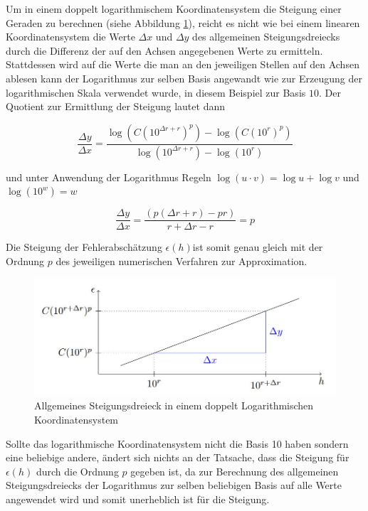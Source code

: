 Um in einem doppelt logarithmischem Koordinatensystem die Steigung einer Geraden zu berechnen (siehe Abbildung \ref{steigung}), reicht es nicht wie bei einem linearen Koordinatensystem die Werte $\Delta x$ und $\Delta y$ des allgemeinen Steigungsdreiecks durch die Differenz der auf den Achsen angegebenen Werte zu ermitteln.\\
Stattdessen wird auf die Werte die man an den jeweiligen Stellen auf den Achsen ablesen kann der Logarithmus zur selben Basis angewandt wie zur Erzeugung der logarithmischen Skala verwendet wurde, in diesem Beispiel zur Basis $10$. Der Quotient zur Ermittlung der Steigung lautet dann 

\begin{equation*}
	\frac{\Delta y}{\Delta x} = \frac{\log(C (10^{\Delta r +r})^p)-\log(C (10^r)^p)}{\log(10^{\Delta r +r}) - \log(10^r)}
\end{equation*} 

und unter Anwendung der Logarithmus Regeln $\log(u\cdot v) = \log u + \log v$ und $\log (10^w) = w$ 

\begin{equation*}
	\frac{\Delta y}{\Delta x} = \frac{(p(\Delta r +r)-pr)}{r+\Delta r -r}
	=p
\end{equation*}

Die Steigung der Fehlerabschätzung $\epsilon (h)$ist somit genau gleich mit der Ordnung $p$ des jeweiligen numerischen Verfahren zur Approximation.

\begin{figure}[htpb]
	\includegraphics[width=\textwidth]{data/SteigungLogPlot}
	\caption{Allgemeines Steigungsdreieck in einem doppelt Logarithmischen Koordinatensystem}
	\label{steigung}
\end{figure}

Sollte das logarithmische Koordinatensystem nicht die Basis 10 haben sondern eine beliebige andere, ändert sich nichts an der Tatsache, dass die Steigung für $\epsilon (h)$ durch die Ordnung $p$ gegeben ist, da zur Berechnung des allgemeinen Steigungsdreiecks der Logarithmus zur selben beliebigen Basis auf alle Werte angewendet wird und somit unerheblich ist für die Steigung.





